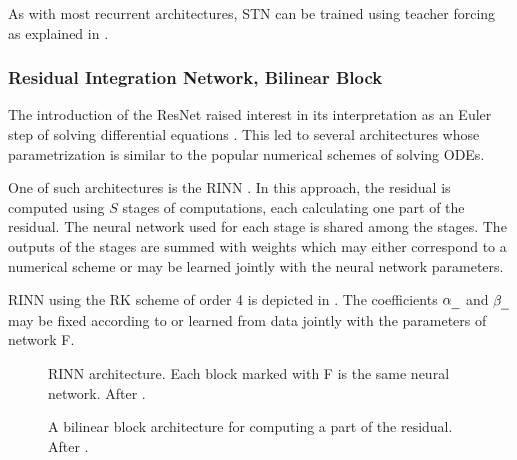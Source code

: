 As with most recurrent architectures, \ac{STN} can be trained using teacher forcing as explained in  \cite{Parker2019}.

\subsubsection{Residual Integration Network, Bilinear Block}

The introduction of the \ac{ResNet} raised interest in its interpretation as an Euler step of solving differential equations \cite{Chen2018}.
This led to several architectures whose parametrization is similar to the popular numerical schemes of solving \acp{ODE}.

One of such architectures is the \acf{RINN} \cite{Ouala2019}.
In this approach, the residual is computed using $S$ stages of computations, each calculating one part of the residual. The neural network used for each stage is shared among the stages. The outputs of the stages are summed with weights which may either correspond to a numerical scheme or may be learned jointly with the neural network parameters.

\Ac{RINN} using the \ac{RK} scheme of order 4 is depicted in . The coefficients $\alpha_\text{\underline{\hspace{2mm}}}$ and $\beta_\text{\underline{\hspace{2mm}}}$ may be fixed according to  or learned from data jointly with the parameters of network F.

\begin{figure}
  \centering
  \scalebox{0.83}{}
  \caption{\Acl{RINN} architecture. Each block marked with F is the same neural network. After \cite{Fablet2017}.}
  \label{fig:rinn4}
\end{figure}

\begin{figure}
  \centering
  \scalebox{0.7}{}
  \caption{A bilinear block architecture for computing a part of the residual. After \cite{Fablet2017}.}
  \label{fig:bilinear_block}
\end{figure}

